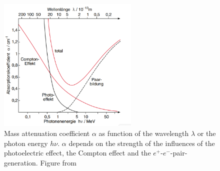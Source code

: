 \begin{figure}[ht]
    \centering
    \includegraphics[width = 0.6\textwidth]{Bilder/Grundlagen/MuAbs.png}
    \caption{Mass attenuation coefficient $\alpha$ as function of the wavelength $\lambda$ or the photon energy $h\nu$. $\alpha$ depends on the strength of the influences of the photoelectric effect, the Compton effect and the $e^+$-$e^-$-pair-generation. Figure from \cite{Demtroeder.2016}}
    \label{fig:muAbs}
\end{figure}
